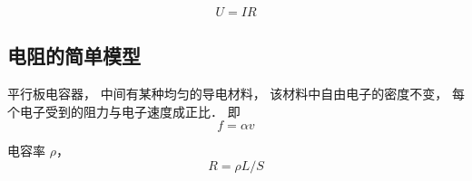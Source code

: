 

\begin{equation}
U = IR
\end{equation}


\subsection{电阻的简单模型}
平行板电容器， 中间有某种均匀的导电材料， 该材料中自由电子的密度不变， 每个电子受到的阻力与电子速度成正比． 即
\begin{equation}
f = \alpha v
\end{equation}



电容率 $\rho$， 
\begin{equation}
R = \rho L / S
\end{equation}
